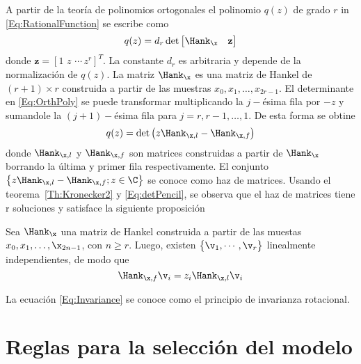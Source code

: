 A partir de la teoría de polinomios ortogonales \cite{Szego1939} el polinomio $q(z)$ de grado $r$ in \eqref{Eq:RationalFunction} se escribe como
\begin{equation}
	q(z) = d_r\det\begin{bmatrix} \Hank_{\x} & \mathbf{z}\end{bmatrix}
	\label{Eq:OrthPoly}
\end{equation}
donde $\mathbf{z} = [1\,\, z \,\,\cdots\, z^r]^T$. La constante $d_r$ es arbitraria y depende de la normalización de $q(z)$. La matriz $\Hank_{\x}$ es una matriz de Hankel de $(r+1)\times r$ construida a partir de las muestras $x_0, x_1,\ldots, x_{2r-1}$. El determinante en \eqref{Eq:OrthPoly} se puede transformar multiplicando la $j-$ésima fila por $-z$ y sumandole la $(j+1)-$ésima fila para $j=r,r-1,\ldots,1$. De esta forma se obtine
\begin{equation}
	q(z) = \det\big(z\Hank_{\x,l}-\Hank_{\x,f}\big)
	\label{Eq:detPencil}
\end{equation}
donde $\Hank_{\x,l}$ y $\Hank_{\x,f}$ son matrices construidas a partir de $\Hank_{\x}$ borrando la última y primer fila respectivamente. El conjunto $\big\{z\Hank_{\x,l}-\Hank_{\x,f};z\in\C\big\}$ se conoce como haz de matrices. Usando el teorema~\ref{Th:Kronecker2} y \eqref{Eq:detPencil}, se observa que el haz de matrices tiene r soluciones y satisface la siguiente proposición
\begin{prop}\label{Prop:Invariance}
	Sea $\Hank_{\x}$ una matriz de Hankel construida a partir de las muestas $x_0, x_1,\ldots,\x_{2n-1}$, con $n\geq r$. Luego, existen $\big\{\v_1,\cdots,\v_r\big\}$ linealmente independientes, de modo que
	\begin{equation}
		\Hank_{\x,f}\v_i = z_i\Hank_{\x,l}\v_i 
		\label{Eq:Invariance}
	\end{equation}
\end{prop}
La ecuación \eqref{Eq:Invariance} se conoce como el principio de invarianza rotacional.


\section{Reglas para la selección del modelo}\label{sec:review}

